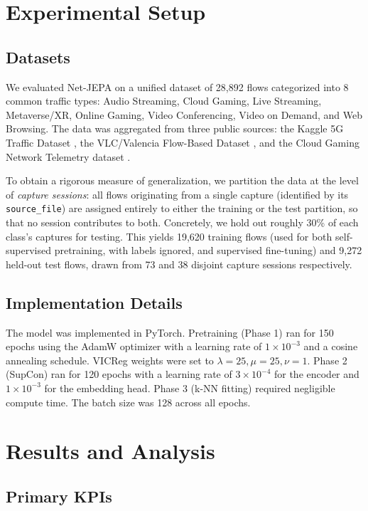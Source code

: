 \documentclass{article}
\begin{document}
\section{Experimental Setup}

\subsection{Datasets}
We evaluated Net-JEPA on a unified dataset of 28,892 flows categorized into 8 common traffic types: Audio Streaming, Cloud Gaming, Live Streaming, Metaverse/XR, Online Gaming, Video Conferencing, Video on Demand, and Web Browsing. The data was aggregated from three public sources: the Kaggle 5G Traffic Dataset \cite{choi5g}, the VLC/Valencia Flow-Based Dataset \cite{vlcvalencia}, and the Cloud Gaming Network Telemetry dataset \cite{cloudgaming}.

To obtain a rigorous measure of generalization, we partition the data at the level of \textit{capture sessions}: all flows originating from a single capture (identified by its \texttt{source\_file}) are assigned entirely to either the training or the test partition, so that no session contributes to both. Concretely, we hold out roughly 30\% of each class's captures for testing. This yields 19,620 training flows (used for both self-supervised pretraining, with labels ignored, and supervised fine-tuning) and 9,272 held-out test flows, drawn from 73 and 38 disjoint capture sessions respectively.

\subsection{Implementation Details}
The model was implemented in PyTorch. Pretraining (Phase 1) ran for 150 epochs using the AdamW optimizer with a learning rate of $1 \times 10^{-3}$ and a cosine annealing schedule. VICReg weights were set to $\lambda=25, \mu=25, \nu=1$. Phase 2 (SupCon) ran for 120 epochs with a learning rate of $3 \times 10^{-4}$ for the encoder and $1 \times 10^{-3}$ for the embedding head. Phase 3 (k-NN fitting) required negligible compute time. The batch size was 128 across all epochs.

\section{Results and Analysis}

\subsection{Primary KPIs}
\end{document}
